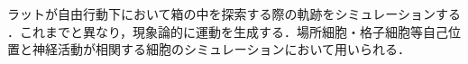 ラットが自由行動下において箱の中を探索する際の軌跡をシミュレーションする \cite{Raudies2012-gp}．これまでと異なり，現象論的に運動を生成する．場所細胞・格子細胞等自己位置と神経活動が相関する細胞のシミュレーションにおいて用いられる．